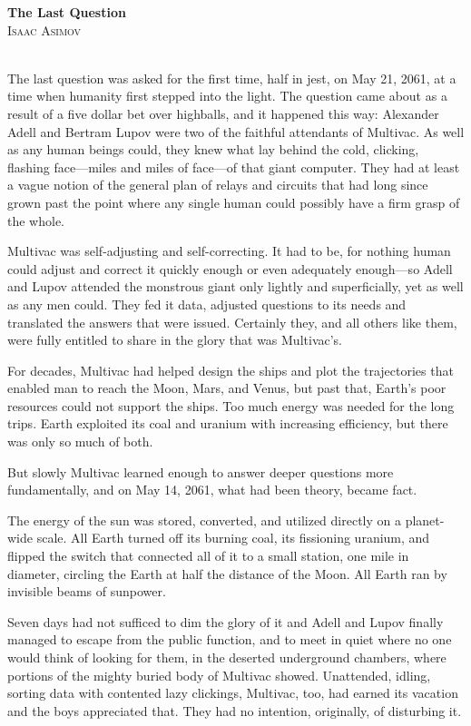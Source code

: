 \documentclass[11pt,twocolumn,paper=a5,pagesize]{article}
\newcommand{\initial}[1]{ \lettrine[lines=3,lhang=0.3,nindent=0em]{  {\textsf{#1}}}{}}
\begin{document}
\thispagestyle{empty}

{
	\textbf{The Last Question}\\
	\textsc{Isaac Asimov}\\
}
\ \\



\pagebreak


\initial{T}he last question was asked for the first time, half in jest, on May 21, 
2061, at a time when humanity first stepped into the light. The question
came about as a result of a five dollar bet over highballs, and it happened
this way:
Alexander Adell and Bertram Lupov were two of the faithful attendants of 
Multivac. As well as any human beings could, they knew what lay behind the 
cold, clicking, flashing face---miles and miles of face---of that giant
computer. They had at least a vague notion of the general plan of relays 
and circuits that had long since grown past the point where any single 
human could possibly have a firm grasp of the whole.

Multivac was self-adjusting and self-correcting. It had to be, for nothing 
human could adjust and correct it quickly enough or even adequately 
enough---so Adell and Lupov attended the monstrous giant only lightly and 
superficially, yet as well as any men could. They fed it data, adjusted 
questions to its needs and translated the answers that were issued. 
Certainly they, and all others like them, were fully entitled to share 
in the glory that was Multivac's.

For decades, Multivac had helped design the ships and plot the trajectories
that enabled man to reach the Moon, Mars, and Venus, but past that, 
Earth's poor resources could not support the ships. Too much energy was 
needed for the long trips. Earth exploited its coal and uranium with 
increasing efficiency, but there was only so much of both.

But slowly Multivac learned enough to answer deeper questions more 
fundamentally, and on May 14, 2061, what had been theory, became fact.

The energy of the sun was stored, converted, and utilized directly on a
planet-wide scale. All Earth turned off its burning coal, its 
fissioning uranium, and flipped the switch that connected all of it to
a small station, one mile in diameter, circling the Earth at half the 
distance of the Moon. All Earth ran by invisible beams of sunpower.

Seven days had not sufficed to dim the glory of it and Adell and Lupov finally managed to escape from the public function, and to meet in quiet where no one would think of looking for them, in the deserted underground chambers, where portions of the mighty buried body of Multivac showed. Unattended, idling, sorting data with contented lazy clickings, Multivac, too, had earned its vacation and the boys appreciated that. They had no intention, originally, of disturbing it.
\end{document}
